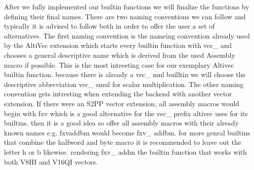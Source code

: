 After we fully implemented our builtin functions we will finalize the functions by defining their final names.
There are two naming conventions we can follow and typically it is advised to follow both in order to offer the user a set of alternatives.
The first naming convention is the nameing convention already used by the AltiVec extension which starts every builtin function with vec\_ and chooses a general descriptive name which is derived from the used Assembly macro if possible.
This is the most intresting case for our exemplary Altivec builtin function.
because there is already a vec\_ mul builltin we will choose the descriptive abbreviation vec\_ smul for scalar multiplication.
The other naming convention gets intresting when extending the backend with another vector extension.
If there were an S2PP vector extension, all assembly macros would begin with fxv which is a good alternative for the vec\_ prefix altivec uses for its builtins.
then it is a good idea so offer all assembly macros with their already known names e.g.
fxvaddbm would become fxv\_ addbm.
for more genral builtins that combine the halfword and byte macro it is recommended to leave out the letter h or b likewise.
rendering fxv\_ addm the builtin function that works with both V8HI and V16QI vectors.
        
